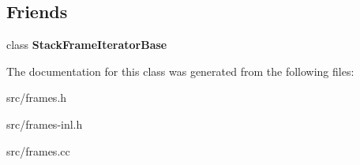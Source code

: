 \subsection*{Friends}
\begin{DoxyCompactItemize}
\item 
\hypertarget{classv8_1_1internal_1_1_exit_frame_ac7310421866976ca454bbe11c5f926c3}{}class {\bfseries Stack\+Frame\+Iterator\+Base}\label{classv8_1_1internal_1_1_exit_frame_ac7310421866976ca454bbe11c5f926c3}

\end{DoxyCompactItemize}


The documentation for this class was generated from the following files\+:\begin{DoxyCompactItemize}
\item 
src/frames.\+h\item 
src/frames-\/inl.\+h\item 
src/frames.\+cc\end{DoxyCompactItemize}
